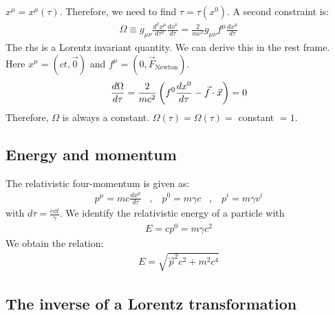 $x^\mu = x^\mu (\tau)$. Therefore, we need to find $\tau = \tau(x^0)$. A second
constraint is:
\begin{align*}
    \Omega \equiv g_{\mu \nu} \frac{d^2 x^\mu}{d \tau^2} \frac{d x^\nu}{d \tau}
    = \frac{2}{m c^2} g_{\mu \nu} f^\mu \frac{d x^\mu}{d \tau}
\end{align*}
The rhs is a Lorentz invariant quantity. We can derive this in the rest frame.
Here $x^\mu = (c t,\vec{0})$ and $f^\mu = (0,\vec{F}_{\text{Newton}})$.
\begin{align*}
    \frac{d \Omega}{d \tau} = \frac{2}{m c^2} \left( f^0 \frac{d x^0}{d \tau} - \vec{f} \cdot \vec{x} \right) = 0
\end{align*}
Therefore, $\Omega$ is always a constant. $\Omega(\tau) = \Omega(\tau) =$
constant $= 1$.

\subsection{Energy and momentum}

The relativistic four-momentum is given as:
\begin{align*}
    p^\mu = m c \frac{d x^\mu}{d \tau}
    \hspace{10pt} , \hspace{10pt}
    p^0 = m \gamma c
    \hspace{10pt} , \hspace{10pt}
    p^i = m \gamma v^i
\end{align*}
with $d \tau = \frac{c \mathds{d} t}{\gamma}$. We identify the relativistic
energy of a particle with
\begin{align*}
    E = c p^0 = m \gamma c^2
\end{align*}
We obtain the relation:
\begin{align*}
    E = \sqrt{\vec{p}^2 c^2 + m^2 c^4}
\end{align*}

\subsection{The inverse of a Lorentz transformation}

